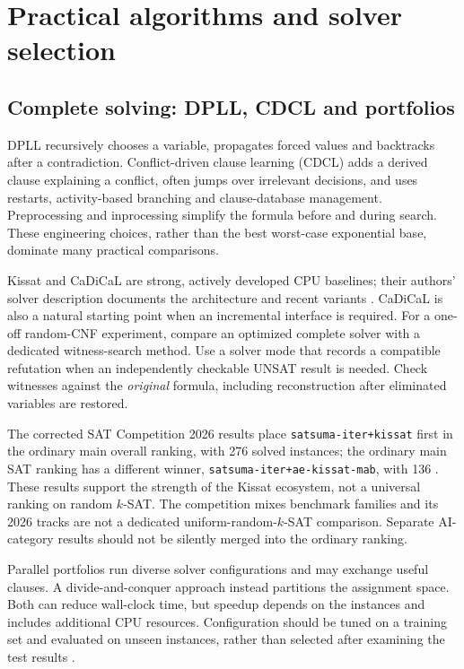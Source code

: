 \section{Practical algorithms and solver selection}
\label{sec:solvers}

\subsection{Complete solving: DPLL, CDCL and portfolios}
DPLL recursively chooses a variable, propagates forced values and backtracks
after a contradiction. Conflict-driven clause learning (CDCL) adds a derived
clause explaining a conflict, often jumps over irrelevant decisions, and
uses restarts, activity-based branching and clause-database management.
Preprocessing and inprocessing simplify the formula before and during search.
These engineering choices, rather than the best worst-case exponential base,
dominate many practical comparisons.

Kissat and CaDiCaL are strong, actively developed CPU baselines; their authors'
solver description documents the architecture and recent variants
\citep{biere2024}. CaDiCaL is also a natural starting point when an incremental
interface is required. For a one-off random-CNF experiment, compare an
optimized complete solver with a dedicated witness-search method. Use a
solver mode that records a compatible refutation when an independently
checkable UNSAT result is needed. Check witnesses against the \emph{original}
formula, including reconstruction after eliminated variables are restored.

The corrected SAT Competition 2026 results place
\texttt{satsuma-iter+kissat} first in the ordinary main overall ranking,
with 276 solved instances; the ordinary main SAT ranking has a different
winner, \texttt{satsuma-iter+ae-kissat-mab}, with 136
\citep[slides 13, 16 and 18]{satcomp2026}. These results support the
strength of the Kissat ecosystem, not a universal ranking on random $k$-SAT.
The competition mixes benchmark families and its 2026 tracks are not a
dedicated uniform-random-$k$-SAT comparison. Separate AI-category results
should not be silently merged into the ordinary ranking.

Parallel portfolios run diverse solver configurations and may exchange useful
clauses. A divide-and-conquer approach instead partitions the assignment
space. Both can reduce wall-clock time, but speedup depends on the instances
and includes additional CPU resources. Configuration should be tuned on a
training set and evaluated on unseen instances, rather than selected after
examining the test results \citep{hutter2017}.

